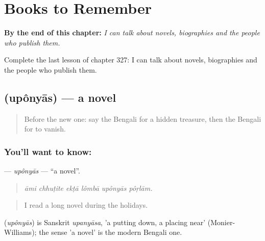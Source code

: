 
\chapter{Books to Remember}
\label{ch:bn-books-to-remember}

\begin{chapteropening}
\textbf{By the end of this chapter:} \emph{I can talk about novels, biographies and the people who publish them.}

Complete the last lesson of chapter 327: I can talk about novels, biographies and the people who publish them.
\end{chapteropening}

\section[\texorpdfstring{\bn{উপন্যাস} (upônyās)}{উপন্যাস (upônyās)}]{ (upônyās) — a novel}

\label{lesson:BN-C327-uponyas}



\begin{quote}
Before the new one: say the Bengali for a hidden treasure, then the Bengali for to vanish.
\end{quote}

\subsection*{You'll want to know: }
\textbf{} — \emph{upônyās} — \textquotedblleft{}a novel\textquotedblright{}.

\begin{quote}
     
\end{quote}

\begin{quote}
\emph{āmi chhuṭite ekṭā lômbā upônyās pôṛlām.}
\end{quote}

\begin{quote}
I read a long novel during the holidays.
\end{quote}

\begin{cousinweb}
\textbf{} (\emph{upônyās}) is Sanskrit \emph{upanyāsa}, 'a putting down, a placing near' (Monier-Williams); the sense 'a novel' is the modern Bengali one.
\end{cousinweb}

